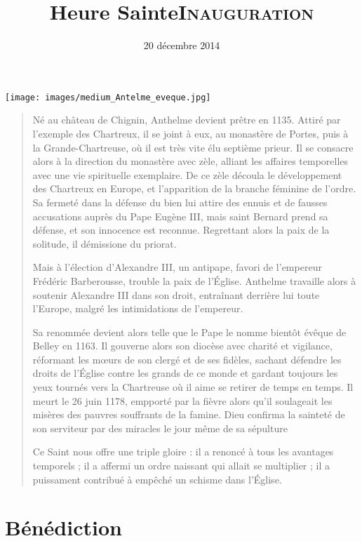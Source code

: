 \documentclass[11.5pt,latin,french,a5paper,twoside]{book}
\title{Heure Sainte}\date{}\author{ }
\title{\textsc{\Huge{Inauguration}}}
\date{20 décembre 2014}
\begin{document}
\maketitle

\pagebreak
{}
\begin{center}
{\texttt{[image: images/medium\_Antelme\_eveque.jpg]}}
\end{center}

\begin{quotation}
\thispagestyle{empty}
Né au château de Chignin, Anthelme devient prêtre en 1135. Attiré par l'exemple des Chartreux, il se joint à eux, au monastère de Portes, puis à la Grande-Chartreuse, où il est très vite élu septième prieur. Il se consacre alors à la direction du monastère avec zèle, alliant les affaires temporelles avec une vie spirituelle exemplaire. De ce zèle découla le développement des Chartreux en Europe, et l'apparition de la branche féminine de l'ordre.
Sa fermeté dans la défense du bien lui attire des ennuis et de fausses accusations auprès du Pape Eugène III, mais saint Bernard prend sa défense, et son innocence est reconnue. Regrettant alors la paix de la solitude, il démissione du priorat.

Mais à l'élection d'Alexandre III, un antipape, favori de l'empereur Frédéric Barberousse, trouble la paix de l'Église. Anthelme travaille alors à soutenir Alexandre III dans son droit, entraînant derrière lui toute l'Europe, malgré les intimidations de l'empereur.

 Sa renommée devient alors telle que le Pape le nomme bientôt évêque de Belley en 1163.
Il gouverne alors son diocèse avec charité et vigilance, réformant les m{\oe}urs de son clergé et de ses fidèles, sachant défendre les droits de l'Église contre les grands de ce monde et gardant toujours les yeux tournés vers la Chartreuse où il aime se retirer de temps en temps.
Il meurt le 26 juin 1178, empporté par la fièvre alors qu'il soulageait les misères des pauvres souffrants de la famine.
Dieu confirma la sainteté de son serviteur par des miracles le jour même de sa sépulture

Ce Saint nous offre une triple gloire : il a renoncé à tous les avantages temporels ; il a affermi un ordre naissant qui allait se multiplier ; il a puissament contribué à empêché un schisme dans l'Église.
\end{quotation} 
\part{Bénédiction}
\end{document}
